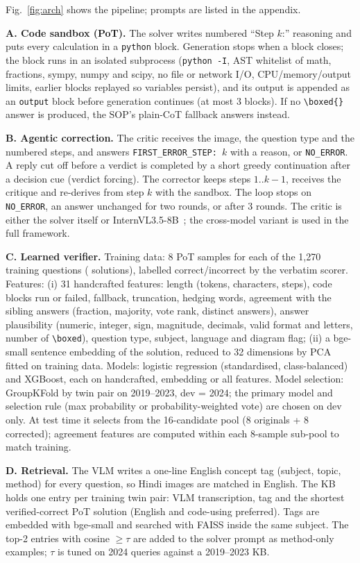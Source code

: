 \documentclass[conference]{IEEEtran}
\begin{document}
Fig.~\ref{fig:arch} shows the pipeline; prompts are listed in the appendix.

\textbf{A. Code sandbox (PoT).} The solver writes numbered ``Step $k$:'' reasoning and puts
every calculation in a \texttt{python} block. Generation stops when a block closes; the block
runs in an isolated subprocess (\texttt{python -I}, AST whitelist of math, fractions, sympy, numpy
and scipy, no file or network I/O, CPU/memory/output limits, earlier blocks replayed so variables
persist), and its output is appended as an \texttt{output} block before generation continues
(at most 3 blocks). If no \verb|\boxed{}| answer is produced, the SOP's plain-CoT fallback
answers instead.

\textbf{B. Agentic correction.} The critic receives the image, the question type and the
numbered steps, and answers \texttt{FIRST\_ERROR\_STEP:~$k$} with a reason, or
\texttt{NO\_ERROR}. A reply cut off before a verdict is completed by a short greedy continuation
after a decision cue (verdict forcing). The corrector keeps steps $1..k{-}1$, receives the
critique and re-derives from step $k$ with the sandbox. The loop stops on \texttt{NO\_ERROR}, an
answer unchanged for two rounds, or after 3 rounds. The critic is either the solver itself or
InternVL3.5-8B~\cite{internvl35}; the cross-model variant is used in the full framework.

\textbf{C. Learned verifier.} Training data: 8 PoT samples for each of the 1{,}270 training
questions (\VerN{} solutions), labelled correct/incorrect by the verbatim scorer. Features:
(i) 31 handcrafted features: length (tokens, characters, steps), code blocks run or failed,
fallback, truncation, hedging words, agreement with the sibling answers (fraction, majority,
vote rank, distinct answers), answer plausibility (numeric, integer, sign, magnitude, decimals,
valid format and letters, number of \verb|\boxed|), question type, subject, language and
diagram flag; (ii) a bge-small sentence embedding of the solution,
reduced to 32 dimensions by PCA fitted on training data. Models: logistic regression (standardised, class-balanced) and XGBoost, each on
handcrafted, embedding or all features. Model selection: GroupKFold by twin pair on 2019--2023,
dev = 2024; the primary model and selection rule (max probability or probability-weighted vote)
are chosen on dev only. At test time it selects from the 16-candidate pool (8 originals + 8
corrected); agreement features are computed within each 8-sample sub-pool to match training.

\textbf{D. Retrieval.} The VLM writes a one-line English concept tag (subject, topic, method)
for every question, so Hindi images are matched in English. The KB holds one entry per training
twin pair: VLM transcription, tag and the shortest verified-correct PoT solution (English and
code-using preferred). Tags are embedded with bge-small and searched with FAISS inside the same
subject. The top-2 entries with cosine $\ge\tau$ are added to the solver prompt as method-only
examples; $\tau$ is tuned on 2024 queries against a 2019--2023 KB.
\end{document}
